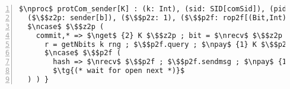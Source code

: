 \centering
\begin{lstlisting}[basicstyle=\scriptsize\BeraMonottFamily, frame=single, mathescape, numbers=left, xleftmargin=2em, xrightmargin=2em]
$\nproc$ protCom_sender[K] : (k: Int), (sid: SID[comSid]), (pid: Int), 
  ($\$$z2p: sender[b]), ($\$$p2z: 1), ($\$$p2f: rop2f[(Bit,Int)]), ($\$$f2p: 1) |- ($\$$c: 1) = {
  $\ncase$ $\$$z2p (
    commit,* => $\nget$ {2} K $\$$z2p ; bit = $\nrecv$ $\$$z2p 
      r = getNbits k rng ; $\$$p2f.query ; $\npay$ {1} K $\$$p2f ; $\nsend$ $\$$p2f pid ; $\nsend$ $\$$p2f (b,r)
      $\ncase$ $\$$p2f (
        hash => $\nrecv$ $\$$p2f ; $\$$p2f.sendmsg ; $\npay$ {1} K $\$$p2f ; $\nsend$ $\$$p2f (Commit h)
        $\tg{(* wait for open next *)}$
  ) ) }
\end{lstlisting}
\caption{The commit case for the sender in \protcom}
\label{fig:protcomsender}
